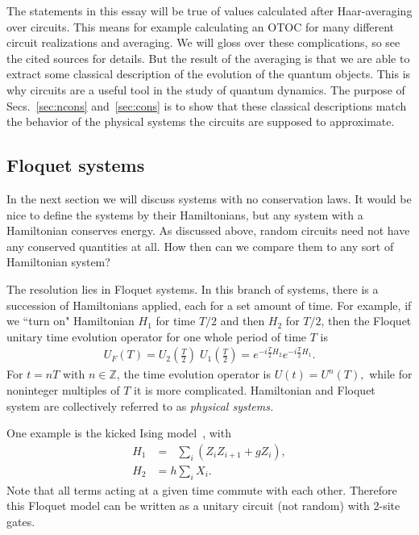 \documentclass[a4paper,11pt]{article}
\newcommand{\nn}{\nonumber\\}
\begin{document}
The statements in this essay will be true of values calculated after Haar-averaging over circuits. This means for example calculating an OTOC for many different circuit realizations and averaging. We will gloss over these complications, so see the cited sources for details. But the result of the averaging is that we are able to extract some classical description of the evolution of the quantum objects. This is why circuits are a useful tool in the study of quantum dynamics. The purpose of Secs.~\ref{sec:ncons} and~\ref{sec:cons} is to show that these classical descriptions match the behavior of the physical systems the circuits are supposed to approximate.

\subsection{Floquet systems} \label{sub:floq}

In the next section we will discuss systems with no conservation laws. It would be nice to define the systems by their Hamiltonians, but any system with a Hamiltonian conserves energy. As discussed above, random circuits need not have any conserved quantities at all. How then can we compare them to any sort of Hamiltonian system?

The resolution lies in Floquet systems. In this branch of systems, there is a succession of Hamiltonians applied, each for a set amount of time. For example, if we ``turn on" Hamiltonian $H_1$ for time $T/2$ and then $H_2$ for $T/2$, then the Floquet unitary time evolution operator for one whole period of time $T$ is 
\begin{align}
U_F(T) = U_2\left(\frac{T}{2}\right)\; U_1\left(\frac{T}{2}\right) = e^{-i\frac{T}{2}H_2} e^{-i\frac{T}{2}H_1}.
\end{align}
For $t=nT$ with $n\in \mathbb{Z}$, the time evolution operator is $U(t)=U^n(T),$ while for noninteger multiples of $T$ it is more complicated. Hamiltonian and Floquet system are collectively referred to as \emph{physical systems.}

One example is the kicked Ising model~\cite{vonKeyserlingkHydro}, with 
\begin{align}
H_1 &= \phantom{h}\sum_i\left(Z_iZ_{i+1}+gZ_i\right),\nn
H_2 &= h\sum_iX_i. \label{eqn:kicked}
\end{align}
Note that all terms acting at a given time commute with each other. Therefore this Floquet model can be written as a unitary circuit (not random) with 2-site gates. 
\end{document}
